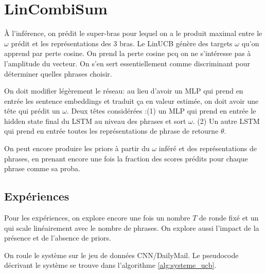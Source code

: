 
\section{LinCombiSum}
\label{section:lincombisum}

À l'inférence, on prédit le super-bras pour lequel on a le produit
maximal entre le $\omega$ prédit et les représentations des 3 bras.
Le LinUCB génère des targets $\omega$ qu'on apprend par perte cosine.
On prend la perte cosine pcq on ne s'intéresse pas à l'amplitude du vecteur.
On s'en sert essentiellement comme discriminant pour déterminer quelles phrases choisir.

On doit modifier légèrement le réseau: au lieu d'avoir un MLP qui prend en entrée
les sentence embeddings et traduit ça en valeur estimée, on doit avoir une
tête qui prédit un $\omega$.
Deux têtes considérées :(1) un MLP qui prend en entrée le hidden state final du LSTM au niveau
des phrases et sort $\omega$.
(2) Un autre LSTM qui prend en entrée toutes les représentations de phrase de retourne $\theta$.

On peut encore produire les priors à partir du $\omega$ inféré et des représentations de phrases,
en prenant encore une fois la fraction des scores prédits pour chaque phrase comme sa proba.

\subsection{Expériences}

Pour les expériences, on explore encore une fois un nombre $T$ de ronde fixé et un qui scale linéairement
avec le nombre de phrases.
On explore aussi l'impact de la présence et de l'absence de priors.

On roule le système sur le jeu de données CNN/DailyMail.
Le pseudocode décrivant le système se trouve dans l'algorithme \ref{alg:systeme_ucb}.

